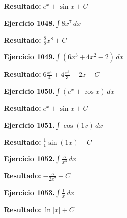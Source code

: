 \documentclass[10pt,a4paper]{article}
\begin{document}
\begin{solbox}
\textbf{Resultado:} \(\displaystyle e^x + \sin x + C\)
\end{solbox}

\newpage
\begin{ejbox}
\textbf{Ejercicio 1048.}\quad $\int 8x^{7}\,dx$
\end{ejbox}

\begin{solbox}
\textbf{Resultado:} \(\displaystyle \frac{8}{8}x^{8} + C\)
\end{solbox}

\begin{ejbox}
\textbf{Ejercicio 1049.}\quad $\int (6x^3 +4x^2 -2)\,dx$
\end{ejbox}

\begin{solbox}
\textbf{Resultado:} \(\displaystyle 6\frac{x^4}{4} +4\frac{x^3}{3} -2x + C\)
\end{solbox}

\begin{ejbox}
\textbf{Ejercicio 1050.}\quad $\int (e^x + \cos x)\,dx$
\end{ejbox}

\begin{solbox}
\textbf{Resultado:} \(\displaystyle e^x + \sin x + C\)
\end{solbox}

\newpage
\begin{ejbox}
\textbf{Ejercicio 1051.}\quad $\int \cos(1x)\,dx$
\end{ejbox}

\begin{solbox}
\textbf{Resultado:} \(\displaystyle \frac{1}{1}\sin(1x) + C\)
\end{solbox}

\begin{ejbox}
\textbf{Ejercicio 1052.}\quad $\int \frac{5}{x^{3}}\,dx$
\end{ejbox}

\begin{solbox}
\textbf{Resultado:} \(\displaystyle -\frac{5}{2x^{2}} + C\)
\end{solbox}

\begin{ejbox}
\textbf{Ejercicio 1053.}\quad $\int \frac{1}{x}\,dx$
\end{ejbox}

\begin{solbox}
\textbf{Resultado:} \(\displaystyle \ln|x| + C\)
\end{solbox}
\end{document}
